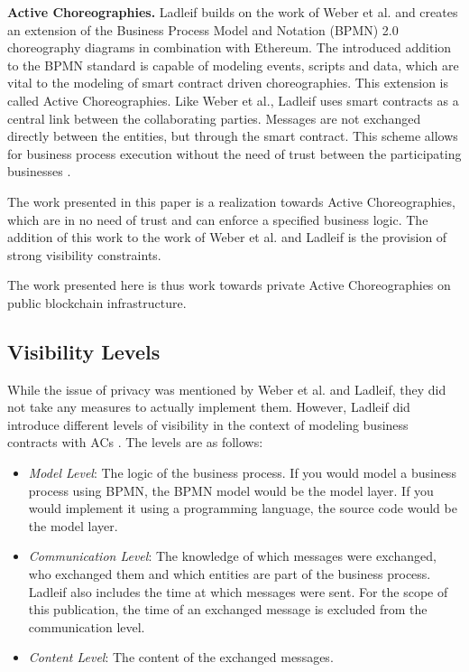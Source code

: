 \documentclass[runningheads]{llncs}
\newcommand{\ber}[1]{\textit{#1}}
\begin{document}
\textbf{Active Choreographies.} Ladleif builds on the work of Weber et al. and creates an extension of the Business Process Model and Notation (BPMN) 2.0 choreography diagrams in combination with Ethereum. The introduced addition to the BPMN standard is capable of modeling events, scripts and data, which are vital to the modeling of smart contract driven choreographies. This extension is called Active Choreographies. Like   Weber et al., Ladleif uses smart contracts as a central link between the collaborating parties. Messages are not exchanged directly between the entities, but through the smart contract. This scheme allows for business process execution without the need of trust between the participating businesses \cite{ladleif}. 


The work presented in this paper is a realization towards Active Choreographies, which are in no need of trust and can enforce a specified business logic. The addition of this work to the work of Weber et al. and Ladleif is the provision of strong visibility constraints. 

The work presented here is thus work towards private Active Choreographies on public blockchain infrastructure. 




\subsection{Visibility Levels} \label{subsec:levels}

While the issue of privacy was mentioned by Weber et al. and Ladleif, they did not take any measures to actually implement them. However, Ladleif did introduce different levels of visibility in the context of modeling business contracts with ACs \cite{ladleif}. The levels are as follows:



\begin{itemize}
    \item \ber{Model Level}: The logic of the business process. If you would model a business process using BPMN, the BPMN model would be the model layer. If you would implement it using a programming language, the source code would be the model layer.
    \item \ber{Communication Level}: The knowledge of which messages were exchanged, who exchanged them and which entities are part of the business process. Ladleif also includes the time at which messages were sent. For the scope of this publication,
    the time of an exchanged message is excluded from the communication level.
    \item \ber{Content Level}: The content of the exchanged messages.
\end{itemize}
\end{document}
